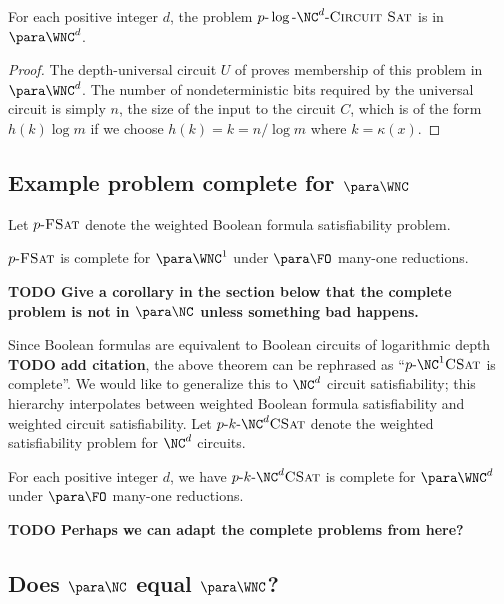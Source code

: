 \documentclass{article}
\newcommand{\todo}[1]{\textbf{TODO #1}}
\newcommand{\dash}{\textnormal{-}}
\newcommand{\pncsat}{p\dash\log\dash\NC^d\dash\textsc{Circuit Sat}}
\begin{document}
\begin{lemma}\label{lem:pncsat}
  For each positive integer $d$, the problem $\pncsat$ is in $\para \WNC^d$.
\end{lemma}
\begin{proof}
  The depth-universal circuit $U$ of \autocite{ch85} proves membership of this problem in $\para \WNC^d$.
  The number of nondeterministic bits required by the universal circuit is simply $n$, the size of the input to the circuit $C$, which is of the form $h(k) \log m$ if we choose $h(k) = k = n / \log m$ where $k = \kappa(x)$.
\end{proof}

\subsection{Example problem complete for \texorpdfstring{$\para \WNC$}{paraWNC}}

Let $p \dash \textsc{FSat}$ denote the weighted Boolean formula satisfiability problem.

\begin{theorem}\label{thm:parawnc1complete}
  $p \dash \textsc{FSat}$ is complete for $\para \WNC^1$ under $\para \FO$ many-one reductions.
\end{theorem}

\todo{Give a corollary in the section below that the complete problem is not in $\para \NC$ unless something bad happens.}

Since Boolean formulas are equivalent to Boolean circuits of logarithmic depth \todo{add citation}, the above theorem can be rephrased as ``$p \dash \NC^1 \textsc{CSat}$ is complete''.
We would like to generalize this to $\NC^d$ circuit satisfiability; this hierarchy interpolates between weighted Boolean formula satisfiability and weighted circuit satisfiability.
Let $p \dash k \dash \NC^d \textsc{CSat}$ denote the weighted satisfiability problem for $\NC^d$ circuits.

\begin{conjecture}\label{con:parawncdcomplete}
  For each positive integer $d$, we have $p \dash k \dash \NC^d \textsc{CSat}$ is complete for $\para \WNC^d$ under $\para \FO$ many-one reductions.
\end{conjecture}

\todo{Perhaps we can adapt the complete problems from \autocite{cc97lim} here?}

\subsection{Does \texorpdfstring{$\para \NC$}{paraNC} equal \texorpdfstring{$\para \WNC$}{paraWNC}?}
\label{sec:fppwpp}
\end{document}
